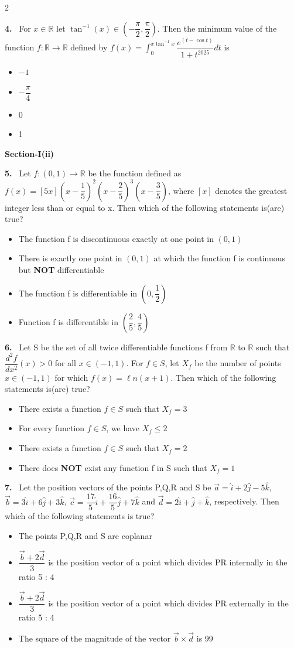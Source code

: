 \documentclass[10pt]{extarticle}
\newcommand{\sect}[1]{\par\smallskip\noindent\textbf{#1}\par}
\newcommand{\qn}[1]{\par\smallskip\noindent\textbf{#1.}~}
\newenvironment{qoptions}{\begin{itemize}[leftmargin=1.8em,itemsep=1pt,topsep=2pt,label={}]}{\end{itemize}}
\newcommand{\opt}[2]{\item[(#1)] #2}
\begin{document}
\begin{multicols}{2}
\qn{4} For $x\in\mathbb R$ let $\tan^{-1}(x)\in\left(-\dfrac\pi2,\dfrac\pi2\right)$. Then the minimum value of the function $f:\mathbb R\to\mathbb R$ defined by $f(x)=\displaystyle\int_0^{x\tan^{-1}x}\dfrac{e^{(t-\cos t)}}{1+t^{2025}}dt$ is
\begin{qoptions}
\opt{A}{$-1$}
\opt{B}{$-\dfrac\pi4$}
\opt{C}{0}
\opt{D}{1}
\end{qoptions}

\sect{Section-I(ii)}

\qn{5} Let $f:(0,1)\to\mathbb R$ be the function defined as $f(x)=[5x]\left(x-\dfrac15\right)^2\left(x-\dfrac25\right)^3\left(x-\dfrac35\right)$, where $[x]$ denotes the greatest integer less than or equal to x. Then which of the following statements is(are) true?
\begin{qoptions}
\opt{A}{The function f is discontinuous exactly at one point in $(0,1)$}
\opt{B}{There is exactly one point in $(0,1)$ at which the function f is continuous but \textbf{NOT} differentiable}
\opt{C}{The function f is differentiable in $\left(0,\dfrac12\right)$}
\opt{D}{Function f is differentible in $\left(\dfrac25,\dfrac45\right)$}
\end{qoptions}

\qn{6} Let S be the set of all twice differentiable functions f from $\mathbb R$ to $\mathbb R$ such that $\dfrac{d^2f}{dx^2}(x)>0$ for all $x\in(-1,1)$. For $f\in S$, let $X_f$ be the number of points $x\in(-1,1)$ for which $f(x)=\ell n(x+1)$. Then which of the following statements is(are) true?
\begin{qoptions}
\opt{A}{There exists a function $f\in S$ such that $X_f=3$}
\opt{B}{For every function $f\in S$, we have $X_f\leq2$}
\opt{C}{There exists a function $f\in S$ such that $X_f=2$}
\opt{D}{There does \textbf{NOT} exist any function f in S such that $X_f=1$}
\end{qoptions}

\qn{7} Let the position vectors of the points P,Q,R and S be $\vec a=\hat i+2\hat j-5\hat k$, $\vec b=3\hat i+6\hat j+3\hat k$, $\vec c=\dfrac{17}5\hat i+\dfrac{16}5\hat j+7\hat k$ and $\vec d=2\hat i+\hat j+\hat k$, respectively. Then which of the following statements is true?
\begin{qoptions}
\opt{A}{The points P,Q,R and S are coplanar}
\opt{B}{$\dfrac{\vec b+2\vec d}3$ is the position vector of a point which divides PR internally in the ratio 5 : 4}
\opt{C}{$\dfrac{\vec b+2\vec d}3$ is the position vector of a point which divides PR externally in the ratio 5 : 4}
\opt{D}{The square of the magnitude of the vector $\vec b\times\vec d$ is 99}
\end{qoptions}


\end{multicols}
\end{document}
